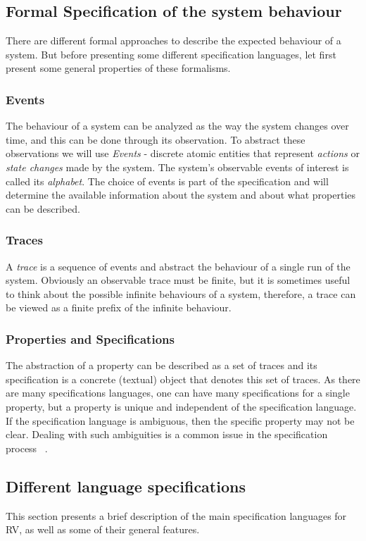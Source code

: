  
\subsection{Formal Specification of the system behaviour}
There are different formal approaches to describe the expected behaviour of a system. But before presenting some different specification languages, let first present some general properties of these formalisms. 

\subsubsection{Events}
The behaviour of a system can be analyzed as the way the system changes over time, and this can be done through its observation. To abstract these observations we will use \textit{Events} - discrete atomic entities that represent \textit{actions} or \textit{state changes} made by the system. 
The system's observable events of interest is called its \textit{alphabet}. The choice of events is part of the specification and will determine the available information about the system and about what properties can be described.

\subsubsection{Traces}
A \textit{trace} is a sequence of events and abstract the behaviour of a single run of the system. Obviously an observable trace must be finite, but it is sometimes useful to think about the possible infinite behaviours of a system, therefore, a trace can be viewed as a finite prefix of the infinite behaviour.

\subsubsection{Properties and Specifications}
The abstraction of a property can be described as a set of traces and its specification is a concrete (textual) object that denotes this set of traces.
As there are many specifications languages, one can have many specifications for a single property, but a property is unique and independent of the specification language. If the specification language is ambiguous, then the specific property may not be clear. Dealing with such ambiguities is a common issue in the specification process ~\cite{rv2}.


\subsection{Different language specifications}
This section presents a brief description of the main specification languages for RV, as well as some of their general features.

